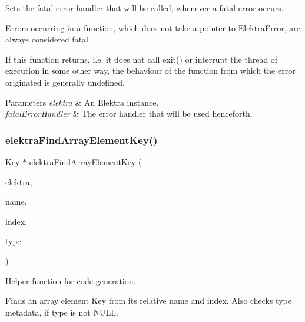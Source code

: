 Sets the fatal error handler that will be called, whenever a fatal error occurs. 

Errors occurring in a function, which does not take a pointer to Elektra\+Error, are always considered fatal.

If this function returns, i.\+e. it does not call exit() or interrupt the thread of execution in some other way, the behaviour of the function from which the error originated is generally undefined.


\begin{DoxyParams}{Parameters}
{\em elektra} & An Elektra instance. \\
\hline
{\em fatal\+Error\+Handler} & The error handler that will be used henceforth. \\
\hline
\end{DoxyParams}
\mbox{\label{group__highlevel_gac822ee43ab690e671ed47129a8b47cdc}} 
\subsubsection{\texorpdfstring{elektraFindArrayElementKey()}{elektraFindArrayElementKey()}}
{\footnotesize\ttfamily Key $\ast$ elektra\+Find\+Array\+Element\+Key (\begin{DoxyParamCaption}\item[{Elektra $\ast$}]{elektra,  }\item[{const char $\ast$}]{name,  }\item[{kdb\+\_\+long\+\_\+long\+\_\+t}]{index,  }\item[{K\+D\+B\+Type}]{type }\end{DoxyParamCaption})}



Helper function for code generation. 

Finds an array element Key from its relative name and index. Also checks type metadata, if {\ttfamily type} is not N\+U\+LL.


